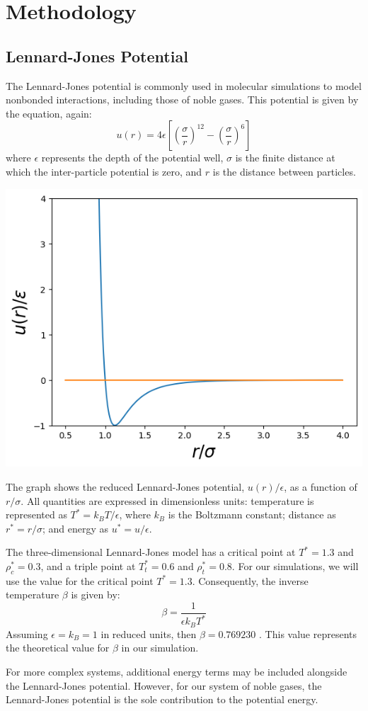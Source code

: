 \documentclass[a4paper,12pt]{article}
\begin{document}
 
\section{Methodology}
\subsection{Lennard-Jones Potential}
The Lennard-Jones potential is commonly used in molecular simulations to model nonbonded interactions, including those of noble gases. This potential is given by the equation, again:
\begin{equation}
    u(r) = 4\epsilon \left[ \left( \frac{\sigma}{r} \right)^{12} - \left( \frac{\sigma}{r} \right)^{6} \right]
\end{equation}
where \( \epsilon \) represents the depth of the potential well, \( \sigma \) is the finite distance at which the inter-particle potential is zero, and \( r \) is the distance between particles.

\begin{multicols}{2}
\begin{center}
 \includegraphics[width = 7.5 cm]{images/01.png}
\end{center}
The graph shows the reduced Lennard-Jones potential, \( u(r) /\epsilon \), as a function of \( r/\sigma \). All quantities are expressed in dimensionless units: temperature is represented as \( T^* = k_B T/\epsilon \), where \( k_B \) is the Boltzmann constant; distance as \( r^* = r/\sigma \); and energy as \( u^* = u/\epsilon \).

The three-dimensional Lennard-Jones model has a critical point at \( T^* = 1.3 \) and \( \rho^*_c = 0.3 \), and a triple point at \( T^*_t = 0.6 \) and \( \rho^*_t = 0.8 \). For our simulations, we will use the value for the critical point \( T^* = 1.3 \). Consequently, the inverse temperature \( \beta \) is given by:
\begin{equation}
    \beta = \frac{1}{\epsilon k_B T^*}
\end{equation}
Assuming \( \epsilon = k_B = 1 \) in reduced units, then \( \beta = 0.769230 \) \citep{Viot2016}. This value represents the theoretical value for \( \beta \) in our simulation.

For more complex systems, additional energy terms may be included alongside the Lennard-Jones potential. However, for our system of noble gases, the Lennard-Jones potential is the sole contribution to the potential energy.

\end{multicols}
\end{document}
